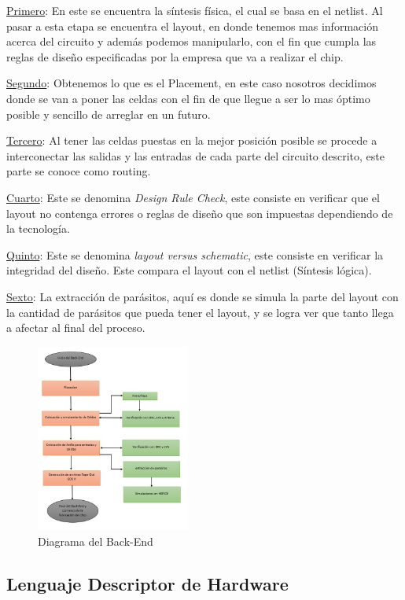 \underline{Primero}: En este se encuentra la síntesis física, el cual se basa en el netlist. Al pasar a esta etapa se encuentra el layout, en donde tenemos mas información acerca del circuito y además podemos manipularlo, con el fin que cumpla las reglas de diseño especificadas por la empresa que va a realizar el chip.

\underline{Segundo}: Obtenemos lo que es el Placement, en este caso nosotros decidimos donde se van a poner las celdas con el fin de que llegue a ser lo mas óptimo posible y sencillo de arreglar en un futuro.

\underline{Tercero}: Al tener las celdas puestas en la mejor posición posible se procede a interconectar las salidas y las entradas de cada parte del circuito descrito, este parte se conoce como routing.

\underline{Cuarto}: Este se denomina \textit{Design Rule Check}, este consiste en verificar que el layout no contenga errores o reglas de diseño que son impuestas dependiendo de la tecnología.

\underline{Quinto}: Este se denomina \textit{layout versus schematic}, este consiste en verificar la integridad del diseño. Este compara el layout con el netlist (Síntesis lógica).

\underline{Sexto}: La extracción de parásitos, aquí es donde se simula la parte del layout con la cantidad de parásitos que pueda tener el layout, y se logra ver que tanto llega a afectar al final del proceso.

 \cite{charls} 
\begin{figure}[t]
    \centering
    \includegraphics[width=0.45\textwidth]{figuras/Back.JPG}
    \caption{Diagrama del Back-End}
    \label{fig:mesh1}
\end{figure}

\subsection*{Lenguaje Descriptor de Hardware}

